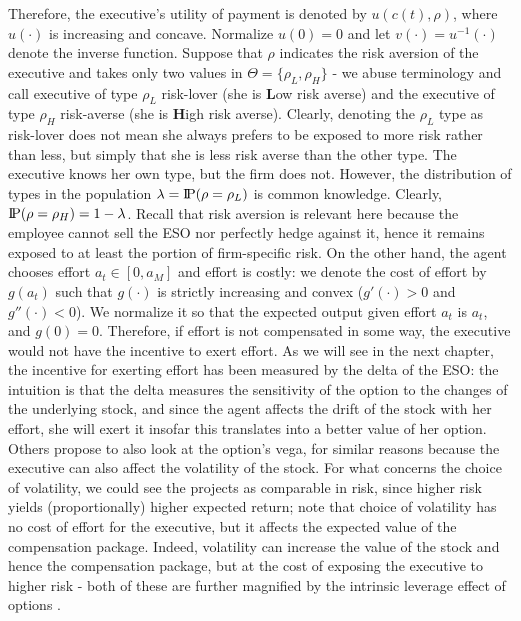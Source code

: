 Therefore, the executive's utility of payment is denoted by $u(c(t), \rho)$, where $u(\cdot)$ is increasing and concave. Normalize $u(0) = 0$ and let $v(\cdot) = u^{-1}(\cdot)$ denote the inverse function. Suppose that $\rho$ indicates the risk aversion of the executive and takes only two values in $\Theta = \{\rho_L, \rho_H \}$ - we abuse terminology and call executive of type $\rho_L$ risk-lover (she is \textbf{L}ow risk averse) and the executive of type $\rho_H$ risk-averse (she is \textbf{H}igh risk averse). Clearly, denoting the $\rho_L$ type as risk-lover does not mean she always prefers to be exposed to more risk rather than less, but simply that she is less risk averse than the other type. The executive knows her own type, but the firm does not. However, the distribution of types in the population $\lambda = \text{I\kern-0.15em P}(\rho = \rho_L)$ is common knowledge. Clearly, $\text{I\kern-0.15em P}(\rho = \rho_H) = 1 - \lambda$. Recall that risk aversion is relevant here because the employee cannot sell the ESO nor perfectly hedge against it, hence it remains exposed to at least the portion of firm-specific risk.
On the other hand, the agent chooses effort $a_t \in [0, a_M]$ and effort is costly: we denote the cost of effort by $g(a_t)$ such that $g(\cdot)$ is strictly increasing and convex ($g'(\cdot) > 0$ and $g''(\cdot)<0$). We normalize it so that the expected output given effort $a_t$ is $a_t$, and $g(0) = 0$. Therefore, if effort is not compensated in some way, the executive would not have the incentive to exert effort. As we will see in the next chapter, the incentive for exerting effort has been measured by the delta of the ESO: %
the intuition is that the delta measures the sensitivity of the option to the changes of the underlying stock, and since the agent affects the drift of the stock with her effort, she will exert it insofar this translates into a better value of her option. Others propose to also look at the option's vega, for similar reasons because the executive can also affect the volatility of the stock. For what concerns the choice of volatility, we could see the projects as comparable in risk, since higher risk yields (proportionally) higher expected return; note that choice of volatility has no cost of effort for the executive, but it affects the expected value of the compensation package. Indeed, volatility can increase the value of the stock and hence the compensation package, but at the cost of exposing the executive to higher risk - both of these are further magnified by the intrinsic leverage effect of options \cite{cadenillas2005executive}.


